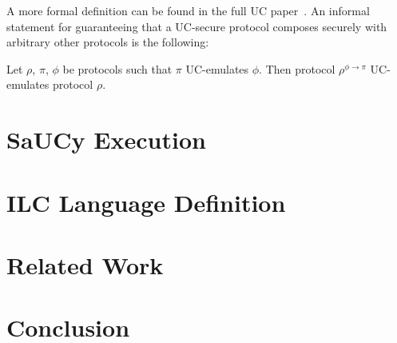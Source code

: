 \documentclass{llncs}
\begin{document}
A more formal definition can be found in the full UC
paper~\cite{canetti2001universally}. An informal statement for guaranteeing that
a UC-secure protocol composes securely with arbitrary other protocols is the following:

\begin{theorem}
Let $\rho$, $\pi$, $\phi$ be protocols such that $\pi$ UC-emulates $\phi$. Then
protocol $\rho^{\phi \rightarrow \pi}$ UC-emulates protocol $\rho$.
\end{theorem}

\section{SaUCy Execution}



\section{ILC Language Definition}

\section{Related Work}

\section{Conclusion}




\appendix
\end{document}
